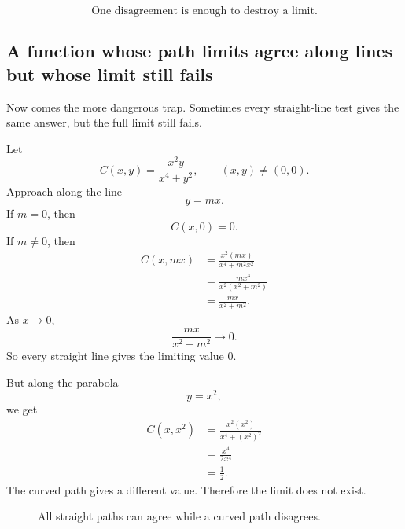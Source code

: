 \[
    \text{One disagreement is enough to destroy a limit.}
\]

\subsection{A function whose path limits agree along lines but whose limit still fails}

Now comes the more dangerous trap.  Sometimes every straight-line test gives the same
answer, but the full limit still fails.

Let
\[
    C(x,y)=\frac{x^2y}{x^4+y^2},
    \qquad (x,y)\ne(0,0).
\]
Approach along the line
\[
    y=mx.
\]
If \(m=0\), then
\[
    C(x,0)=0.
\]
If \(m\ne0\), then
\[
\begin{aligned}
    C(x,mx)
    &=
    \frac{x^2(mx)}{x^4+m^2x^2}\\
    &=
    \frac{mx^3}{x^2(x^2+m^2)}\\
    &=
    \frac{mx}{x^2+m^2}.
\end{aligned}
\]
As \(x\to0\),
\[
    \frac{mx}{x^2+m^2}\to0.
\]
So every straight line gives the limiting value \(0\).

But along the parabola
\[
    y=x^2,
\]
we get
\[
\begin{aligned}
    C(x,x^2)
    &=
    \frac{x^2(x^2)}{x^4+(x^2)^2}\\
    &=
    \frac{x^4}{2x^4}\\
    &=
    \frac12.
\end{aligned}
\]
The curved path gives a different value.  Therefore the limit does not exist.

\begin{figure}[h]
\centering
{}
\caption{All straight paths can agree while a curved path disagrees.}
\end{figure}

